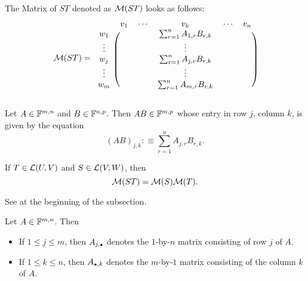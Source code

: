 The Matrix of $ST$ denoted as $\mathcal{M}(ST)$ looks as follows:
\begin{equation}
  \mathcal{M} (ST) =
  \begin{blockarray}{cccccc}
             & v_1 & \cdots &  v_k      & \cdots & v_n \\
    \begin{block}{c(ccccc)}
      w_1    &     &        &  
        \sum_{r=1}^{n} A_{1,r}  B_{r,k} &        &     \\
      \vdots &     &        &  \vdots   &        &     \\
      w_j    &     &        &  
        \sum_{r=1}^{n} A_{j,r}  B_{r,k} &        &     \\
      \vdots &     &        &  \vdots   &        &     \\
      w_m    &     &        &  
        \sum_{r=1}^{n} A_{m,r}  B_{r,k} &        &     \\
    \end{block}
  \end{blockarray}
\end{equation}

\setcounter{thm}{40}
\begin{mydef} 
  \label{def: matrix multiplication}
  Let $A \in \mathbb{F}^{m,n}$ and $B \in \mathbb{F}^{n,p}$. Then $AB \in \mathbb{F}^{m,p}$ whose entry in row $j$, column $k$, is given by the equation
  \begin{equation}
    (AB)_{j,k} :\equiv \sum_{r=1}^{n} A_{j,r} B_{r,k}.
  \end{equation} %
\end{mydef}

\setcounter{thm}{42}
\begin{thm}
  If $T \in \mathcal{L}(U,V)$ and $S\in \mathcal{L}(V,W)$, then 
  \begin{equation}
    \mathcal{M}(ST) = \mathcal{M}(S) \mathcal{M}(T).
  \end{equation}
\end{thm}
\begin{prf}
  See at the beginning of the subsection.
\end{prf}

\begin{mydef}  Let $A\in \mathbb{F}^{m,n}$. Then
  \begin{itemize}
    \item If $1 \leq j \leq m$, then $A_{j, \mathsmaller{\bullet}}$ denotes the $1$-by-$n$ matrix consisting of row $j$ of $A$. 
    \item If $1 \leq k \leq n$, then  $A_{\mathsmaller{\bullet}, k}$ denotes the $m$-by-$1$ matrix consisting of the column $k$ of $A$.
  \end{itemize}
\end{mydef}

